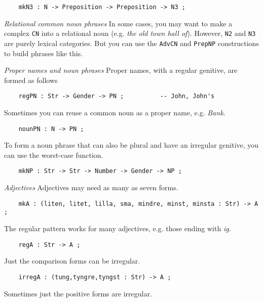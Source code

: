 \documentclass[11pt,a4paper]{article}
\newcommand{\subsubsubsection}[1]{\textit{#1}}
\begin{document}
\begin{verbatim}
    mkN3 : N -> Preposition -> Preposition -> N3 ;
\end{verbatim}

\subsubsubsection{Relational common noun phrases}
In some cases, you may want to make a complex \texttt{CN} into a
relational noun (e.g. \textit{the old town hall of}). However, \texttt{N2} and
\texttt{N3} are purely lexical categories. But you can use the \texttt{AdvCN}
and \texttt{PrepNP} constructions to build phrases like this.

\subsubsubsection{Proper names and noun phrases}
Proper names, with a regular genitive, are formed as follows

\begin{verbatim}
    regPN : Str -> Gender -> PN ;          -- John, John's
\end{verbatim}

Sometimes you can reuse a common noun as a proper name, e.g. \textit{Bank}.

\begin{verbatim}
    nounPN : N -> PN ;
\end{verbatim}

To form a noun phrase that can also be plural and have an irregular
genitive, you can use the worst-case function.

\begin{verbatim}
    mkNP : Str -> Str -> Number -> Gender -> NP ; 
\end{verbatim}

\subsubsubsection{Adjectives}
Adjectives may need as many as seven forms. 

\begin{verbatim}
    mkA : (liten, litet, lilla, sma, mindre, minst, minsta : Str) -> A ;
\end{verbatim}

The regular pattern works for many adjectives, e.g. those ending
with \textit{ig}.

\begin{verbatim}
    regA : Str -> A ;
\end{verbatim}

Just the comparison forms can be irregular.

\begin{verbatim}
    irregA : (tung,tyngre,tyngst : Str) -> A ;
\end{verbatim}

Sometimes just the positive forms are irregular.
\end{document}
